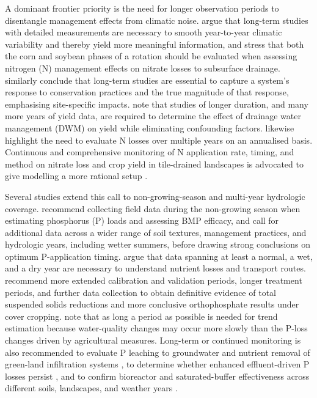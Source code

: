 \documentclass[11pt]{article}
\begin{document}
A dominant frontier priority is the need for longer observation periods to disentangle management effects from climatic noise. \textcite{Randall2003,Randall2005} argue that long-term studies with detailed measurements are necessary to smooth year-to-year climatic variability and thereby yield more meaningful information, and stress that both the corn and soybean phases of a rotation should be evaluated when assessing nitrogen (N) management effects on nitrate losses to subsurface drainage. \textcite{Waring2024} similarly conclude that long-term studies are essential to capture a system's response to conservation practices and the true magnitude of that response, emphasising site-specific impacts. \textcite{Cooke2012} note that studies of longer duration, and many more years of yield data, are required to determine the effect of drainage water management (DWM) on yield while eliminating confounding factors. \textcite{Pittelkow2017} likewise highlight the need to evaluate N losses over multiple years on an annualised basis. Continuous and comprehensive monitoring of N application rate, timing, and method on nitrate loss and crop yield in tile-drained landscapes is advocated to give modelling a more rational setup \parencite{Jeong2018}.

Several studies extend this call to non-growing-season and multi-year hydrologic coverage. \textcite{VanEsbroeck2016} recommend collecting field data during the non-growing season when estimating phosphorus (P) loads and assessing BMP efficacy, and call for additional data across a wider range of soil textures, management practices, and hydrologic years, including wetter summers, before drawing strong conclusions on optimum P-application timing. \textcite{vanderSalm2012} argue that data spanning at least a normal, a wet, and a dry year are necessary to understand nutrient losses and transport routes. \textcite{SalcedaGonzalez2025} recommend more extended calibration and validation periods, longer treatment periods, and further data collection to obtain definitive evidence of total suspended solids reductions and more conclusive orthophosphate results under cover cropping. \textcite{Ulén2007} note that as long a period as possible is needed for trend estimation because water-quality changes may occur more slowly than the P-loss changes driven by agricultural measures. Long-term or continued monitoring is also recommended to evaluate P leaching to groundwater and nutrient removal of green-land infiltration systems \parencite{Duan2015}, to determine whether enhanced effluent-driven P losses persist \parencite{Monaghan2004}, and to confirm bioreactor and saturated-buffer effectiveness across different soils, landscapes, and weather years \parencite{Jaynes2019}.
\end{document}

